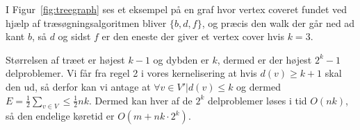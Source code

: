 I Figur~\ref{fig:treegraph} ses et eksempel på en graf hvor vertex coveret fundet ved hjælp af træsøgningsalgoritmen bliver $\{b,d,f\}$, og præcis den walk der går ned ad kant $b$, så $d$ og sidst $f$ er den eneste der giver et vertex cover hvis $k = 3$.

Størrelsen af træet er højest $k-1$ og dybden er $k$, dermed er der højest $2^{k}-1$ delproblemer. Vi får fra regel 2 i vores kernelisering at hvis $d(v) \ge k+1$ skal den ud, så derfor kan vi antage at $\forall v \in V' | d(v) \le k$ og dermed $E = \frac{1}{2} \sum_{v \in V} \le \frac{1}{2}nk$. Dermed kan hver af de $2^{k}$ delproblemer løses i tid $O(nk)$, så den endelige køretid er $O(m+nk \cdot 2^{k})$.

